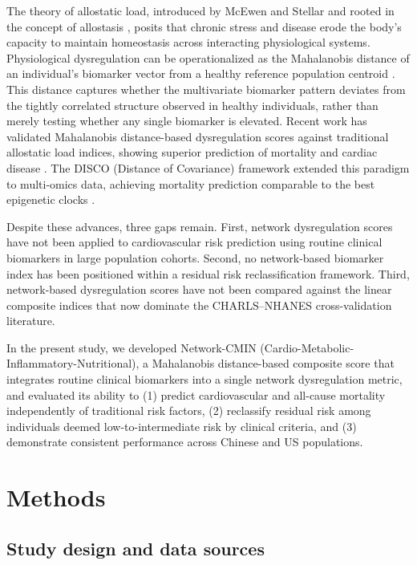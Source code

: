 \documentclass[11pt,a4paper]{article}
\begin{document}
The theory of allostatic load, introduced by McEwen and Stellar \cite{mcewen1993allostatic} and rooted in the concept of allostasis \cite{sterling1988allostasis}, posits that chronic stress and disease erode the body's capacity to maintain homeostasis across interacting physiological systems. Physiological dysregulation can be operationalized as the Mahalanobis distance of an individual's biomarker vector from a healthy reference population centroid \cite{li2022mahalanobis}. This distance captures whether the multivariate biomarker pattern deviates from the tightly correlated structure observed in healthy individuals, rather than merely testing whether any single biomarker is elevated. Recent work has validated Mahalanobis distance-based dysregulation scores against traditional allostatic load indices, showing superior prediction of mortality and cardiac disease \cite{edes2025mahalanobis}. The DISCO (Distance of Covariance) framework extended this paradigm to multi-omics data, achieving mortality prediction comparable to the best epigenetic clocks \cite{hao2025disco}.

Despite these advances, three gaps remain. First, network dysregulation scores have not been applied to cardiovascular risk prediction using routine clinical biomarkers in large population cohorts. Second, no network-based biomarker index has been positioned within a residual risk reclassification framework. Third, network-based dysregulation scores have not been compared against the linear composite indices that now dominate the CHARLS--NHANES cross-validation literature.

In the present study, we developed Network-CMIN (Cardio-Metabolic-Inflammatory-Nutritional), a Mahalanobis distance-based composite score that integrates routine clinical biomarkers into a single network dysregulation metric, and evaluated its ability to (1) predict cardiovascular and all-cause mortality independently of traditional risk factors, (2) reclassify residual risk among individuals deemed low-to-intermediate risk by clinical criteria, and (3) demonstrate consistent performance across Chinese and US populations.

\section{Methods}

\subsection{Study design and data sources}
\end{document}
